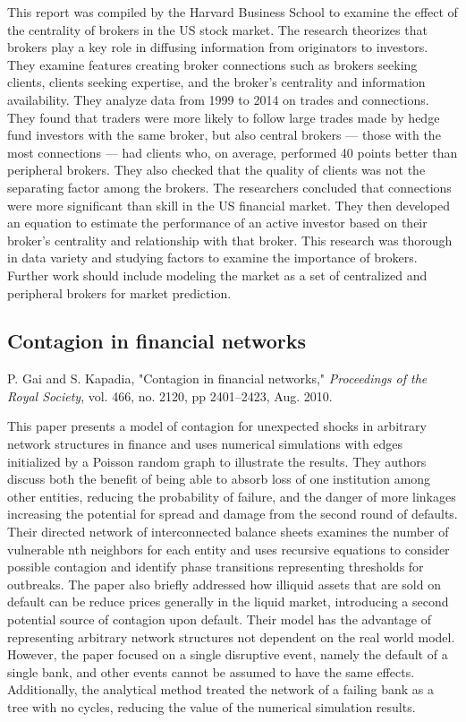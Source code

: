 \documentclass[12pt]{article}
\begin{document}
This report was compiled by the Harvard Business School to examine the effect of the centrality of brokers in the US stock market. The research theorizes that brokers play a key role in diffusing information from originators to investors. They examine features creating broker connections such as brokers seeking clients, clients seeking expertise, and the broker's centrality and information availability. They analyze data from 1999 to 2014 on trades and connections. They found that traders were more likely to follow large trades made by hedge fund investors with the same broker, but also central brokers — those with the most connections — had clients who, on average, performed 40 points better than peripheral brokers. They also checked that the quality of clients was not the separating factor among the brokers. The researchers concluded that connections were more significant than skill in the US financial market. They then developed an equation to estimate the performance of an active investor based on their broker’s centrality and relationship with that broker. This research was thorough in data variety and studying factors to examine the importance of brokers. Further work should include modeling the market as a set of centralized and peripheral brokers for market prediction.


\subsection{Contagion in financial networks}
P. Gai and S. Kapadia, "Contagion in financial networks," \textit{Proceedings of the Royal Society}, vol. 466, no. 2120, pp 2401–2423, Aug. 2010.
\newline

This paper presents a model of contagion for unexpected shocks in arbitrary network structures in finance and uses numerical simulations with edges initialized by a Poisson random graph to illustrate the results. They authors discuss both the benefit of being able to absorb loss of one institution among other entities, reducing the probability of failure, and the danger of more linkages increasing the potential for spread and damage from the second round of defaults. Their directed network of interconnected balance sheets examines the number of vulnerable nth neighbors for each entity and uses recursive equations to consider possible contagion and identify phase transitions representing thresholds for outbreaks. The paper also briefly addressed how illiquid assets that are sold on default can be reduce prices generally in the liquid market, introducing a second potential source of contagion upon default. Their model has the advantage of representing arbitrary network structures not dependent on the real world model. However, the paper focused on a single disruptive event, namely the default of a single bank, and other events cannot be assumed to have the same effects. Additionally, the analytical method treated the network of a failing bank as a tree with no cycles, reducing the value of the numerical simulation results.
\end{document}
